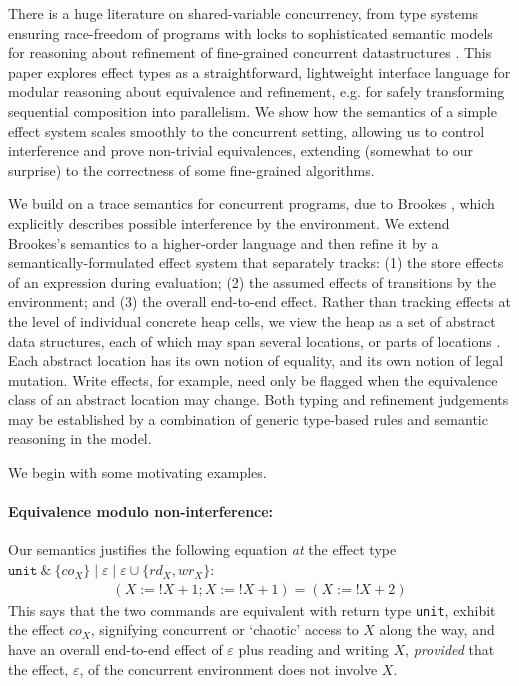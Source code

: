 \documentclass[nocopyrightspace,preprint]{sigplanconf}
\newcommand{\keywd}[1]{\mathtt{#1}}
\newcommand{\myread}[1]{!{#1}}
\newcommand{\unittype}{\keywd{unit}}
\newcommand{\assign}[2]{{#1}:={#2}}
\newcommand{\eff}{\varepsilon}
\newcommand{\rEff}[1]{\ensuremath{\mathit{rd}_{#1}}}
\newcommand{\cEff}[1]{\ensuremath{\mathit{co}_{#1}}}
\newcommand{\wEff}[1]{\ensuremath{\mathit{wr}_{#1}}}
\newcommand{\cloc}{\ensuremath{X}\xspace}
\begin{document}
There is a huge literature on shared-variable
concurrency, from type systems ensuring race-freedom of programs with
locks \cite{abadi:typessafelock} to sophisticated semantic models for
reasoning about refinement of fine-grained concurrent datastructures
\cite{dreyer}. This paper explores effect types as a
straightforward, lightweight interface language for modular reasoning
about equivalence and refinement, e.g. for safely transforming
sequential composition into parallelism.  We show how the semantics of
a simple effect system scales smoothly to the concurrent setting,
allowing us to control interference and prove non-trivial
equivalences, extending (somewhat to our surprise) to the correctness
of some fine-grained algorithms.

We build on a trace semantics for concurrent programs, due to Brookes
\cite{brookes96ic}, which explicitly describes possible interference
by the environment. We extend Brookes's semantics to a higher-order
language and then refine it by a semantically-formulated effect system
that separately tracks: (1) the store effects of an expression during
evaluation; (2) the assumed effects of transitions by the environment;
and (3) the overall end-to-end effect.  
Rather than tracking effects at
the level of individual concrete heap cells, we view the heap as a set
of abstract data structures, each of which may span several locations,
or parts of locations \cite{DBLP:dblp_conf/popl/Benton0N14}. Each abstract location has its own notion of
equality, and its own notion of legal mutation. Write effects, for
example, need only be flagged when the equivalence class of an
abstract location may change. Both typing and refinement judgements may be established by a combination of generic type-based rules and semantic reasoning in the model.













\label{examples}
We begin with some motivating examples. 

\paragraph{Equivalence modulo non-interference:}
Our semantics justifies the following equation \emph{at} the  effect type 
$\unittype\ \&\ \{\cEff{\cloc}\} \mid \eff \mid \eff \cup \{\rEff{\cloc}, \wEff{\cloc}\}$:
\[\begin{array}{l}
 (\assign{\cloc}{\myread{\cloc} + 1}; \assign{\cloc}{\myread{\cloc}+ 1})   = 
 (\assign{\cloc}{\myread{\cloc} + 2}) 
\end{array}
\]
This says that the two commands are equivalent with return type \texttt{unit}, exhibit the effect $\cEff{\cloc}$, signifying concurrent or `chaotic' access to $\cloc$ along the way, and have an overall end-to-end effect of $\eff$ plus reading and writing $\cloc$, \emph{provided} that the effect, $\eff$, of the concurrent environment does not involve $\cloc$.
\nopagebreak
\end{document}
